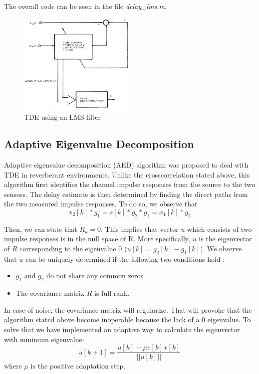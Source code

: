 The overall code can be seen in the file \emph{delay\_lms.m}\cite{delaylms.m}.

\begin{figure}[htb]
	\begin{center}
		\includegraphics[width=0.5\textwidth]{figures/LMS.png}
	\end{center}
	\caption{TDE using an LMS filter}
	\label{fig:LMS}
\end{figure}


\subsection{Adaptive Eigenvalue Decomposition}
Adaptive eigenvalue decomposition (AED) algorithm was proposed to deal with TDE in reverberant environments. Unlike the crosscorrelation stated above, this algorithm first identifies the channel impulse responses from the source to the two sensors. The delay estimate is then determined by finding the direct paths from the two measured impulse responses. To do so, we observe that
\begin{dmath}
  x_2[k] * g_1 = s[k] * g_2 * g_1 = x_1[k] * g_2
\end{dmath}
  
  Then, we can state that $R_u = 0$. This implies that vector $u$ which consists of two impulse responses is in the null space of R. More specifically, $u$ is the eigenvector of $R$ corresponding to the eigenvalue 0 ($u[k]=g_2[k] - g_1[k]$). We observe that $u$ can be uniquely determined if the following two conditions hold \cite{overview, aed}:
\begin{itemize}
  \item $g_1$ and $g_2$ do not share any common zeros.
  \item The covariance matrix $R$ is full rank.
\end{itemize}

  In case of noise, the covariance matrix will regularize. That will provoke that the algorithm stated above become inoperable because the lack of a 0 eigenvalue. To solve that we have implemented an adaptive way to calculate the eigenvector with minimum eigenvalue:
 \begin{dmath}
    u[k+1] = \frac{u[k] - \mu e[k] x[k]}{||u[k]||}
 \end{dmath}
 where $\mu$ is the positive adaptation step.
 

